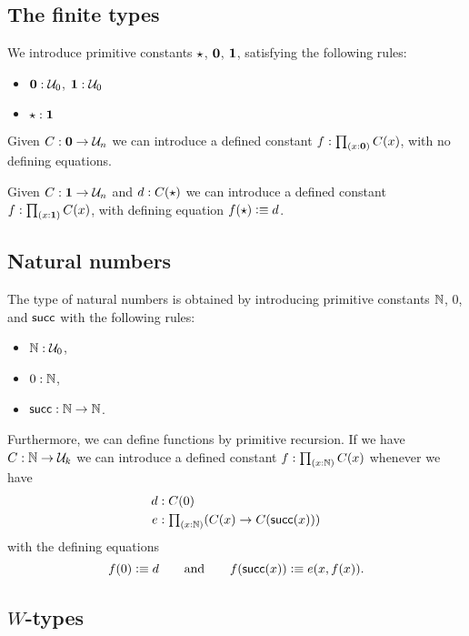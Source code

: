 \subsection{The finite types}

We introduce primitive constants $\star$, $\mathbf{0}$, $\mathbf{1}$, satisfying the following rules:
%
\begin{itemize}
\item $\mathbf{0} : \mathcal{U}_0$, $\mathbf{1} : \mathcal{U}_0$
\item $\star:\mathbf{1}$
\end{itemize}

Given $C : \mathbf{0} \rightarrow \mathcal{U}_n$ we can introduce a defined constant $f:\tprd{x:\emptyt} C(x)$, with no defining equations.

Given $C : \mathbf{1} \rightarrow \mathcal{U}_n$ and $d : C(\star)$ we can introduce a defined constant $f:\tprd{x:\unit} C(x)$, with defining equation $f(\star) \vcentcolon\equiv d$.

\subsection{Natural numbers}

The type of natural numbers is obtained by introducing primitive constants
$\mathbb{N}$, $0$, and $\mathsf{succ}$ with the following rules:
%
\begin{itemize}
  \item $\mathbb{N} : \mathcal{U}_0$,
  \item $0:\mathbb{N}$,
  \item $\mathsf{succ}:\mathbb{N}\rightarrow \mathbb{N}$.
\end{itemize}
%
Furthermore, we can define functions by primitive recursion. If we have
$C : \mathbb{N} \rightarrow \mathcal{U}_k $ we can introduce a defined constant $f:\tprd{x:\N}C(x)$ whenever we have
%
\begin{align*}
  d & : C(0) \\
  e & : \tprd{x:\N}(C(x)\rightarrow C(\suc (x)))
\end{align*}
%
with the defining equations
%
\begin{equation*}
  f(0) \vcentcolon\equiv d
  \qquad\text{and}\qquad
  f(\mathsf{succ} (x)) \vcentcolon\equiv e(x,f(x)).
\end{equation*}

\subsection{\texorpdfstring{$W$}{W}-types}

